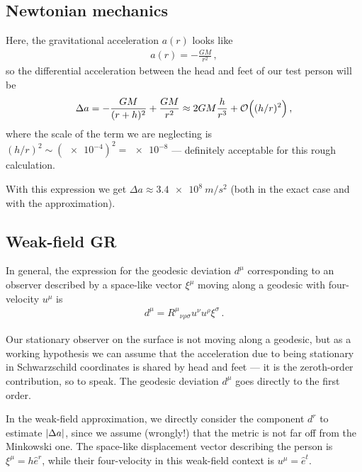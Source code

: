 \documentclass[main.tex]{subfiles}
\begin{document}
\subsection{Newtonian mechanics}

Here, the gravitational acceleration \(a (r)\) looks like 
%
\begin{align}
a (r) = - \frac{GM}{r^2}
\,,
\end{align}
%
so the differential acceleration between the head and feet of our test person will be 
%
\begin{align}
\Delta a = - \frac{GM}{(r + h)^2} + \frac{GM}{r^2} \approx 2GM \frac{h}{r^3} + \order{ (h / r)^2}
\,,
\end{align}
%
where the scale of the term we are neglecting is \((h / r)^2 \sim (\num{e-4})^2 = \num{e-8}\) --- definitely acceptable for this rough calculation.

With this expression we get \(\Delta a \approx \SI{3.4e8}{m/s^2}\) (both in the exact case and with the approximation). 

\subsection{Weak-field GR}

In general, the expression for the geodesic deviation \(d^{\mu }\) corresponding to an observer described by a space-like vector \(\xi^{\mu }\) moving along a geodesic with four-velocity \(u^{\mu }\)  is \cite[eq.\ 3.208]{carrollSpacetimeGeometryIntroduction2019}
%
\begin{align}
d^{\mu } = R^{\mu }{}_{\nu \rho \sigma  } u^{\nu } u^{\rho } \xi^{\sigma }
\,.
\end{align}

Our stationary observer on the surface is not moving along a geodesic, but as a working hypothesis we can assume that
the acceleration due to being stationary in Schwarzschild coordinates is shared by head and feet --- it is the zeroth-order contribution, so to speak. 
The geodesic deviation \(d^{\mu }\) goes directly to the first order. 

In the weak-field approximation, we directly consider the component \(d^{r}\) to estimate \(\abs{\Delta a}\), since we assume (wrongly!) that the metric is not far off from the Minkowski one.
The space-like displacement vector describing the person is \(\xi^{\mu } = h \hat{e}^{r}\), while their four-velocity in this weak-field context is \(u^{\mu } = \hat{e}^{t}\). 
\end{document}
